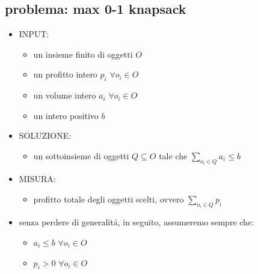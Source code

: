 \subsection*{problema: max 0-1 knapsack}
\begin{flushleft}
	\begin{itemize}
		\item INPUT:
		\begin{itemize}
			\item un insieme finito di oggetti $O$
			\item un profitto intero $p_i$ $\forall o_i\in O$
			\item un volume intero $a_i$ $\forall o_i\in O$
			\item un intero positivo $b$
		\end{itemize}
		\item SOLUZIONE:
		\begin{itemize}
			\item un sottoinsieme di oggetti $Q\subseteq O$ tale che $\sum_{o_i\in Q}a_i\leq b$
		\end{itemize}
		\item MISURA:
		\begin{itemize}
			\item profitto totale degli oggetti scelti, ovvero $\sum_{o_i\in Q}p_i$
		\end{itemize}
		\vspace{0.5cm}
		\item senza perdere di generalit\'a, in seguito, assumeremo sempre che:
		\begin{itemize}
			\item $a_i\leq b$ $\forall o_i\in O$
			\item $p_i>0$ $\forall o_i\in O$
		\end{itemize}
	\end{itemize}
\end{flushleft}


